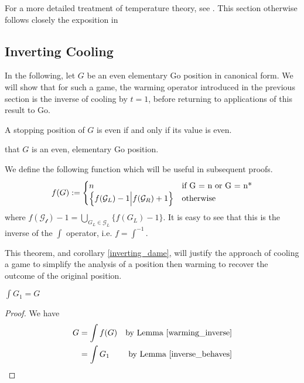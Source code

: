 \documentclass[../math194_paper.tex]{subfiles}
\begin{document}
For a more detailed treatment of temperature theory, see \cite[\S 9]{conway2000numbers}.
This section otherwise follows closely the exposition in \cite[\S 3.5-3.6]{berlekamp1994mathematical}

\subsection{Inverting Cooling}

In the following, let $G$ be an even elementary Go position in canonical form.
We will show that for such a game, the warming operator introduced in the previous 
section is the inverse of cooling by $t=1$, before returning to applications of 
this result to Go.\\

\begin{lemma}
    A stopping position of $G$ is even if and only if its value is even.
\end{lemma}



that $G$ is an even, elementary Go position.

We define the following function which will be useful in subsequent proofs.
\[
    f(G) := \begin{cases}
        n & \text{if } $G = n$ \text{ or } $G = n*$ \\
        \left\{ 
        f(\mathcal{G}_L) - 1 \Big| f(\mathcal{G}_R) + 1
        \right\} & \text{otherwise}
    \end{cases}
\]
where $f(\mathcal{G_l}) - 1 = \bigcup_{G_L \in \mathcal{G}_L} \{f(G_L) - 1\}$.
It is easy to see that this is the inverse of the $\int$ operator, i.e. $f = \int^{-1}$.

This theorem, and corollary \ref{inverting_dame}, will justify the approach of cooling a
game to simplify the analysis of a position then warming to recover the outcome 
of the original position.
\begin{theorem} $\int G_1 = G$
    \label{inverting}
\end{theorem}
\begin{proof}
    We have 
    \begin{align*}
        G &= \int f(G) & \text{by Lemma } \ref{warming_inverse} \\
        &= \int G_1 & \text{by Lemma } \ref{inverse_behaves}
    \end{align*}
\end{proof}
\end{document}
